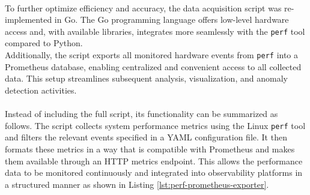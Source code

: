 \\
To further optimize efficiency and accuracy, the data acquisition script was re-implemented in Go. The Go programming language offers low-level hardware access and, with available libraries, integrates more seamlessly with the \texttt{perf} tool compared to Python.\\
Additionally, the script exports all monitored hardware events from \texttt{perf} into a Prometheus database, enabling centralized and convenient access to all collected data. This setup streamlines subsequent analysis, visualization, and anomaly detection activities.\\
\\
Instead of including the full script, its functionality can be summarized as follows. The script collects system performance metrics using the Linux \texttt{perf} tool and filters the relevant events specified in a YAML configuration file. It then formats these metrics in a way that is compatible with Prometheus and makes them available through an HTTP metrics endpoint. This allows the performance data to be monitored continuously and integrated into observability platforms in a structured manner as shown in Listing \ref{lst:perf-prometheus-exporter}.

